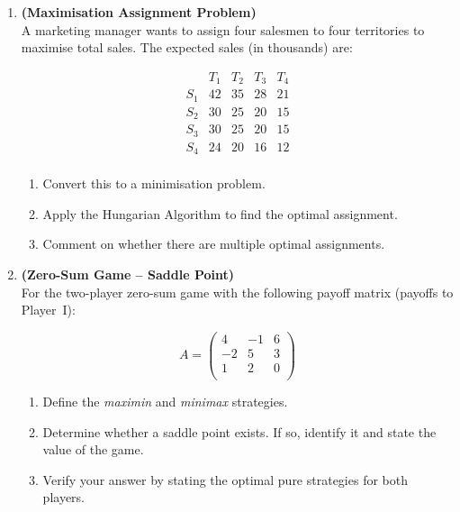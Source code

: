 \documentclass[12pt,a4paper]{article}
\begin{document}
\begin{enumerate}[leftmargin=*, label=\textbf{Q.\arabic*.}]
  Apply the \textit{Hungarian Algorithm} to find the optimal assignment and
  the minimum total time.

\item \textbf{(Maximisation Assignment Problem)}\\
  A marketing manager wants to assign four salesmen to four territories to
  maximise total sales.  The expected sales (in thousands) are:

  \[
    \begin{array}{c|cccc}
      & T_1 & T_2 & T_3 & T_4\\\hline
      S_1 & 42 & 35 & 28 & 21 \\
      S_2 & 30 & 25 & 20 & 15 \\
      S_3 & 30 & 25 & 20 & 15 \\
      S_4 & 24 & 20 & 16 & 12 \\
    \end{array}
  \]

  \begin{enumerate}[label=(\alph*)]
    \item Convert this to a minimisation problem.
    \item Apply the Hungarian Algorithm to find the optimal assignment.
    \item Comment on whether there are multiple optimal assignments.
  \end{enumerate}

\item \textbf{(Zero-Sum Game -- Saddle Point)}\\
  For the two-player zero-sum game with the following payoff matrix (payoffs to
  Player~I):

  \[
    A = \begin{pmatrix}
          4 & -1 & 6 \\
         -2 &  5 & 3 \\
          1 &  2 & 0 \\
        \end{pmatrix}
  \]

  \begin{enumerate}[label=(\alph*)]
    \item Define the \textit{maximin} and \textit{minimax} strategies.
    \item Determine whether a saddle point exists.  If so, identify it and
          state the value of the game.
    \item Verify your answer by stating the optimal pure strategies for both
          players.
  \end{enumerate}


\end{enumerate}
\end{document}
